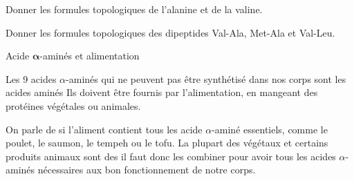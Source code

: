 \schematisation
Donner les formules topologiques de l'alanine et de la valine.
\correction{
  \centering
  \chemfig{!\valine}  \qq{} \chemfig{!\alanine}
}
\pasCorrection{\vspace*{4cm}}

\schematisation
Donner les formules topologiques des dipeptides Val-Ala, Met-Ala et Val-Leu.
\vfill

\begin{doc}{Acide $\mathbf{\alpha}$-aminés et alimentation}
  \begin{importants}
    Les 9 acides $\alpha$-aminés qui ne peuvent pas être synthétisé dans nos corps sont les acides aminés 
    Ils doivent être fournis par l'alimentation, en mangeant des protéines végétales ou animales.
  \end{importants}
  
  On parle de  si l'aliment contient tous les acide $\alpha$-aminé essentiels, comme le poulet, le saumon, le tempeh ou le tofu.
  La plupart des végétaux et certains produits animaux sont des  il faut donc les combiner pour avoir tous les acides $\alpha$-aminés nécessaires aux bon fonctionnement de notre corps.
\end{doc}
